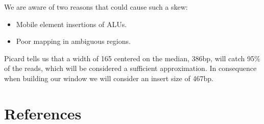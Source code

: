 \documentclass{article}
\begin{document}
We are aware of two reasons that could cause such a skew:
\begin{itemize}
    \item Mobile element insertions of ALUs.
    \item Poor mapping in ambiguous regions.
\end{itemize}

Picard tells us that a width of 165 centered on the median, 386bp, will catch 95\% of the reads,
which will be considered a sufficient approximation. In consequence when building our window we will
consider an insert size of 467bp.


\section*{References}

{}

\end{document}
